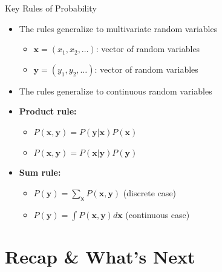 \documentclass{beamer}
\begin{document}
\begin{frame}{Key Rules of Probability}
  \begin{itemize}
  \item The rules generalize to multivariate random variables
    \begin{itemize}
      \item $\mathbf{x} = (x_1, x_2, \ldots)$: vector of random variables
      \item $\mathbf{y} = (y_1, y_2, \ldots)$: vector of random variables
      \end{itemize}
    \item The rules generalize to continuous random variables

    \item \textbf{Product rule:}
      \begin{itemize}
      \item $P(\mathbf{x}, \mathbf{y}) = P(\mathbf{y}|\mathbf{x})P(\mathbf{x})$
      \item $P(\mathbf{x}, \mathbf{y}) = P(\mathbf{x}|\mathbf{y})P(\mathbf{y})$
      \end{itemize}
    \item \textbf{Sum rule:}
      \begin{itemize}
      \item $P(\mathbf{y}) = \sum_{\mathbf{x}} P(\mathbf{x}, \mathbf{y})$ (discrete case)
      \item $P(\mathbf{y}) = \int P(\mathbf{x}, \mathbf{y}) d\mathbf{x}$ (continuous case)
      \end{itemize}
    \end{itemize}
\end{frame}

\section{Recap \& What's Next}
\end{document}
